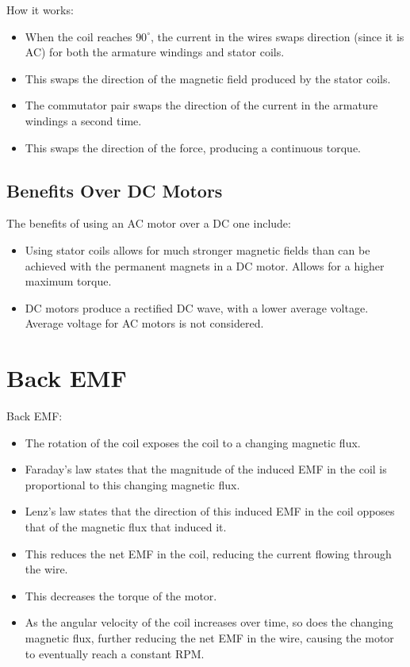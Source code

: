 \documentclass[a4paper,11pt]{report}
\begin{document}
How it works:

\begin{itemize}
\item When the coil reaches $90^\circ$, the current in the wires swaps direction
	(since it is AC) for both the armature windings and stator coils.
\item This swaps the direction of the magnetic field produced by the stator
	coils.
\item The commutator pair swaps the direction of the current in the armature
	windings a second time.
\item This swaps the direction of the force, producing a continuous torque.
\end{itemize}

\subsection{Benefits Over DC Motors}

The benefits of using an AC motor over a DC one include:

\begin{itemize}
\item Using stator coils allows for much stronger magnetic fields than can be
	achieved with the permanent magnets in a DC motor. Allows for a higher
	maximum torque.
\item DC motors produce a rectified DC wave, with a lower average voltage.
	Average voltage for AC motors is not considered.
\end{itemize}


\section{Back EMF}

Back EMF:

\begin{itemize}
\item The rotation of the coil exposes the coil to a changing magnetic flux.
\item Faraday's law states that the magnitude of the induced EMF in the coil
	is proportional to this changing magnetic flux.
\item Lenz's law states that the direction of this induced EMF in the coil
	opposes that of the magnetic flux that induced it.
\item This reduces the net EMF in the coil, reducing the current flowing through
	the wire.
\item This decreases the torque of the motor.
\item As the angular velocity of the coil increases over time, so does the
	changing magnetic flux, further reducing the net EMF in the wire, causing
	the motor to eventually reach a constant RPM.
\end{itemize}
\end{document}

